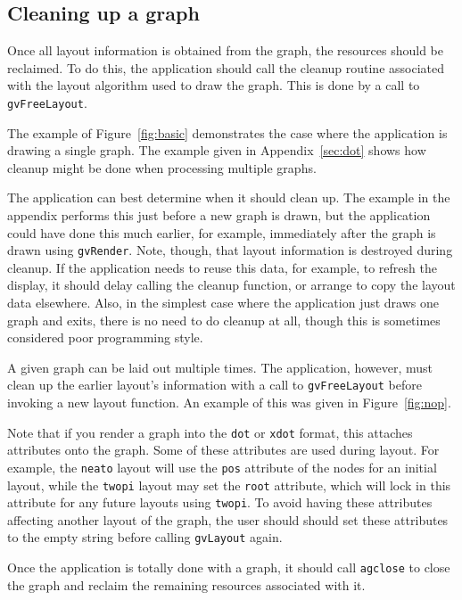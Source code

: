 \subsection{Cleaning up a graph}
\label{sec:clean}

Once all layout information is obtained from the graph, the resources
should be reclaimed. To do this, the application should call
the cleanup routine associated with the layout algorithm used to
draw the graph. This is done by a call to {\tt gvFreeLayout}.

The example of Figure~\ref{fig:basic}
demonstrates the case where the application is drawing a single graph.
The example given in Appendix~\ref{sec:dot}
shows how cleanup might be done when processing multiple graphs.

The application can best determine when it should clean up. The example
in the appendix
performs this just before a new graph is drawn, but the application could
have done this much earlier, for example, immediately after the graph
is drawn using {\tt gvRender}. Note, though, that layout information
is destroyed during cleanup. If the application needs to reuse this
data, for example, to refresh the display, it should delay calling the
cleanup function, or arrange to copy the layout data elsewhere.
Also, in the simplest case where the application just draws one graph
and exits, there is no need to do cleanup at all, though this is sometimes
considered poor programming style.

A given graph can be laid out multiple times.
The application, however, must clean up the earlier layout's
information with a call to {\tt gvFreeLayout}
before invoking a new layout function.
An example of this was given in Figure~\ref{fig:nop}.

Note that if you render a graph into the {\tt dot} or {\tt xdot}
format, this attaches attributes onto the graph. Some of these attributes
are used during layout. For example, the {\tt neato} layout will use
the {\tt pos} attribute of the nodes for an initial layout, while the
{\tt twopi} layout may set the {\tt root} attribute, which will lock in
this attribute for any future layouts using {\tt twopi}.
To avoid having these attributes affecting another
layout of the graph, the user should should set these attributes to the
empty string before calling {\tt gvLayout} again.

Once the application is totally done with a graph, it should call
{\tt agclose} to close the graph and reclaim the remaining resources associated
with it.

